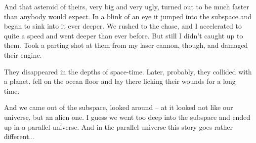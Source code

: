 \documentclass[ebook,twoside,final,openright]{memoir}
\begin{document}
And that asteroid of theirs, very big and very ugly, turned out to be much faster than anybody would expect. In a blink of an eye it jumped into the subspace and began to sink into it ever deeper. We rushed to the chase, and I accelerated to quite a speed and went deeper than ever before. But still I didn’t caught up to them. Took a parting shot at them from my laser cannon, though, and damaged their engine.\par
They disappeared in the depths of space-time. Later, probably, they collided with a planet, fell on the ocean floor and lay there licking their wounds for a long time.\par
And we came out of the subspace, looked around – at it looked not like our universe, but an alien one. I guess we went too deep into the subspace and ended up in a parallel universe. And in the parallel universe this story goes rather different...
\end{document}
